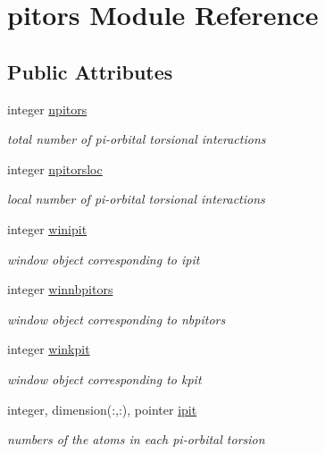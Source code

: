 \hypertarget{classpitors}{\section{pitors Module Reference}
\label{classpitors}
}
\subsection*{Public Attributes}
\begin{DoxyCompactItemize}
\item 
integer \hyperlink{classpitors_adba60d0e3c4560af9ac8c900f964317e}{npitors}
\begin{DoxyCompactList}\small\item\em total number of pi-\/orbital torsional interactions \end{DoxyCompactList}\item 
integer \hyperlink{classpitors_a9704e23ab1f75ad5103e3d73edca9b56}{npitorsloc}
\begin{DoxyCompactList}\small\item\em local number of pi-\/orbital torsional interactions \end{DoxyCompactList}\item 
integer \hyperlink{classpitors_a8c58b89806225b8f5f4a47400419cef5}{winipit}
\begin{DoxyCompactList}\small\item\em window object corresponding to ipit \end{DoxyCompactList}\item 
integer \hyperlink{classpitors_a0f241a8dfb37f5d7a9222c1ea95f28fc}{winnbpitors}
\begin{DoxyCompactList}\small\item\em window object corresponding to nbpitors \end{DoxyCompactList}\item 
integer \hyperlink{classpitors_a619eb0d57818f9db1b52cd36abb7f774}{winkpit}
\begin{DoxyCompactList}\small\item\em window object corresponding to kpit \end{DoxyCompactList}\item 
integer, dimension(\-:,\-:), pointer \hyperlink{classpitors_a25344f75e9e9d0d8044761881ac3e89d}{ipit}
\begin{DoxyCompactList}\small\item\em numbers of the atoms in each pi-\/orbital torsion \end{DoxyCompactList}\item 

\end{DoxyCompactItemize}
